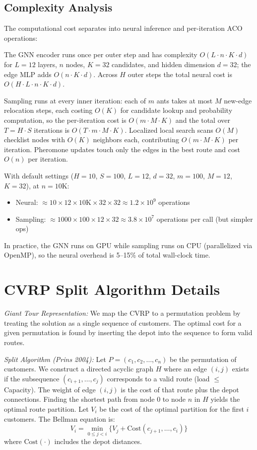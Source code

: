\documentclass[sigconf,anonymous,review]{acmart}
\theoremstyle{definition}
\theoremstyle{plain}
\begin{document}
\subsection{Complexity Analysis}
The computational cost separates into neural inference and per-iteration ACO operations:

The GNN encoder runs once per outer step and has complexity $O(L \cdot n \cdot K \cdot d)$ for $L=12$ layers, $n$ nodes, $K=32$ candidates, and hidden dimension $d=32$; the edge MLP adds $O(n \cdot K \cdot d)$.
Across $H$ outer steps the total neural cost is $O(H \cdot L \cdot n \cdot K \cdot d)$.

Sampling runs at every inner iteration: each of $m$ ants takes at most $M$ new-edge relocation steps, each costing $O(K)$ for candidate lookup and probability computation, so the per-iteration cost is $O(m \cdot M \cdot K)$ and the total over $T=H{\cdot}S$ iterations is $O(T \cdot m \cdot M \cdot K)$.
Localized local search scans $O(M)$ checklist nodes with $O(K)$ neighbors each, contributing $O(m \cdot M \cdot K)$ per iteration.
Pheromone updates touch only the edges in the best route and cost $O(n)$ per iteration.


With default settings ($H=10$, $S=100$, $L=12$, $d=32$, $m=100$, $M=12$, $K=32$), at $n=10$K:
\begin{itemize}
    \item Neural: $\approx 10 \times 12 \times 10\text{K} \times 32 \times 32 \approx 1.2 \times 10^9$ operations
    \item Sampling: $\approx 1000 \times 100 \times 12 \times 32 \approx 3.8 \times 10^7$ operations per call (but simpler ops)
\end{itemize}
In practice, the GNN runs on GPU while sampling runs on CPU (parallelized via OpenMP), so the neural overhead is 5--15\% of total wall-clock time.

\section{CVRP Split Algorithm Details}
\label{app:split}
\emph{Giant Tour Representation:} 
We map the CVRP to a permutation problem by treating the solution as a single sequence of customers. The optimal cost for a given permutation is found by inserting the depot into the sequence to form valid routes.

\emph{Split Algorithm (Prins 2004):}
Let $P = (c_1, c_2, \dots, c_n)$ be the permutation of customers. We construct a directed acyclic graph $H$ where an edge $(i, j)$ exists if the subsequence $(c_{i+1}, \dots, c_j)$ corresponds to a valid route (load $\le$ Capacity). The weight of edge $(i, j)$ is the cost of that route plus the depot connections. Finding the shortest path from node 0 to node $n$ in $H$ yields the optimal route partition.
Let $V_i$ be the cost of the optimal partition for the first $i$ customers. The Bellman equation is:
\[ V_i = \min_{0 \le j < i} \{ V_j + \text{Cost}(c_{j+1}, \dots, c_i) \} \]
where $\text{Cost}(\cdot)$ includes the depot distances.
\end{document}
